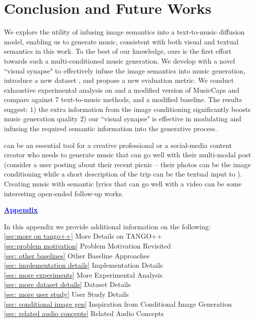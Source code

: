 \vspace{10pt}
\section{Conclusion and Future Works}
\label{Conclusions}
We explore the utility of infusing image semantics into a text-to-music diffusion model, enabling us to generate music, consistent with both visual and textual semantics in this work. To the best of our knowledge, ours is the first effort towards such a multi-conditioned music generation. We develop \modelname with a novel ``visual synapse" to effectively infuse the image semantics into music generation, introduce a new dataset \ourdataset, and propose a new evaluation metric.
We conduct exhaustive experimental analysis on  \ourdataset and a modified version of MusicCaps \cite{musiclm} and compare \modelname against $7$ text-to-music methods, and a modified baseline. The results suggest: $1$) the extra information from the image conditioning significantly boosts music generation quality $2$) our ``visual synapse" is effective in modulating and infusing the required semantic information into the generative process.

\modelname can be an essential tool for a creative professional or a social-media content creator who needs to generate music that can go well with their multi-modal post (consider a user posting about their recent picnic -- their photos can be the image conditioning while a short description of the trip can be the textual input to \modelname). Creating music with semantic lyrics that can go well with a video can be some interesting open-ended follow-up works.

{
    \small
        }

\newpage

\newpage
\appendix

\begin{center}
\begin{LARGE}
\textbf{\underline{\textcolor{blue}{Appendix}}}
\end{LARGE}
\end{center}

\noindent In this appendix we provide additional information on the following: \\
\ref{sec:more on tango++} More Details on TANGO++ \\
\ref{sec:problem motivation} Problem Motivation Revisited \\
\ref{sec: other baselines} Other Baseline Approaches\\
\ref{sec: implementation details} Implementation Details \\
\ref{sec: more experiments} More Experimental Analysis \\
\ref{sec: more dataset details} Dataset Details \\
\ref{sec: more user study} User Study Details \\
\ref{sec: conditional image gen} Inspiration from Conditional Image Generation \\
\ref{sec: related audio concepts} Related Audio Concepts \\

